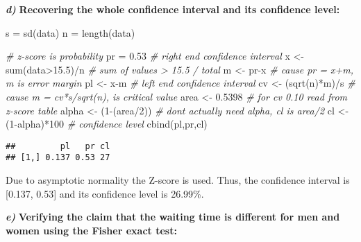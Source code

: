 \documentclass[
]{article}
\newenvironment{Shaded}{\begin{snugshade}}{\end{snugshade}}
\newcommand{\CommentTok}[1]{\textcolor[rgb]{0.56,0.35,0.01}{\textit{#1}}}
\newcommand{\DecValTok}[1]{\textcolor[rgb]{0.00,0.00,0.81}{#1}}
\newcommand{\FloatTok}[1]{\textcolor[rgb]{0.00,0.00,0.81}{#1}}
\newcommand{\FunctionTok}[1]{\textcolor[rgb]{0.00,0.00,0.00}{#1}}
\newcommand{\NormalTok}[1]{#1}
\newcommand{\OtherTok}[1]{\textcolor[rgb]{0.56,0.35,0.01}{#1}}
\newcommand{\SpecialCharTok}[1]{\textcolor[rgb]{0.00,0.00,0.00}{#1}}
\begin{document}
\textbf{\emph{d)}} \textbf{Recovering the whole confidence interval and
its confidence level:}

\begin{Shaded}
\begin{Highlighting}[]
\NormalTok{s }\OtherTok{=} \FunctionTok{sd}\NormalTok{(data)}
\NormalTok{n }\OtherTok{=} \FunctionTok{length}\NormalTok{(data)}

\CommentTok{\# z{-}score is probability}
\NormalTok{pr }\OtherTok{=} \FloatTok{0.53} \CommentTok{\# right end confidence interval}
\NormalTok{x }\OtherTok{\textless{}{-}} \FunctionTok{sum}\NormalTok{(data}\SpecialCharTok{\textgreater{}}\FloatTok{15.5}\NormalTok{)}\SpecialCharTok{/}\NormalTok{n }\CommentTok{\# sum of values \textgreater{} 15.5 / total}
\NormalTok{m }\OtherTok{\textless{}{-}}\NormalTok{ pr}\SpecialCharTok{{-}}\NormalTok{x }\CommentTok{\# cause pr = x+m, m is error margin}
\NormalTok{pl }\OtherTok{\textless{}{-}}\NormalTok{ x}\SpecialCharTok{{-}}\NormalTok{m }\CommentTok{\# left end confidence interval}
\NormalTok{cv }\OtherTok{\textless{}{-}}\NormalTok{ (}\FunctionTok{sqrt}\NormalTok{(n)}\SpecialCharTok{*}\NormalTok{m)}\SpecialCharTok{/}\NormalTok{s }\CommentTok{\# cause m = cv*s/sqrt(n), is critical value}
\NormalTok{area }\OtherTok{\textless{}{-}} \FloatTok{0.5398} \CommentTok{\# for cv 0.10 read from z{-}score table}
\NormalTok{alpha }\OtherTok{\textless{}{-}}\NormalTok{ (}\DecValTok{1}\SpecialCharTok{{-}}\NormalTok{(area}\SpecialCharTok{/}\DecValTok{2}\NormalTok{)) }\CommentTok{\# don\textquotesingle{}t actually need alpha, cl is area/2}
\NormalTok{cl }\OtherTok{\textless{}{-}}\NormalTok{ (}\DecValTok{1}\SpecialCharTok{{-}}\NormalTok{alpha)}\SpecialCharTok{*}\DecValTok{100} \CommentTok{\# confidence level}
\FunctionTok{cbind}\NormalTok{(pl,pr,cl)}
\end{Highlighting}
\end{Shaded}

\begin{verbatim}
##         pl   pr cl
## [1,] 0.137 0.53 27
\end{verbatim}

Due to asymptotic normality the Z-score is used. Thus, the confidence
interval is {[}0.137, 0.53{]} and its confidence level is 26.99\%.

\textbf{\emph{e)}} \textbf{Verifying the claim that the waiting time is
different for men and women using the Fisher exact test:}
\end{document}
